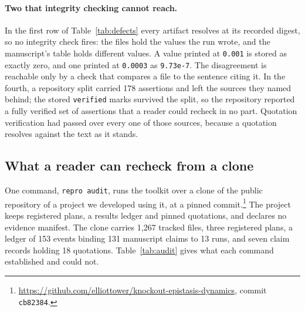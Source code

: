 \documentclass{article}
\newcommand{\code}[1]{\texttt{#1}}
\begin{document}
\paragraph{Two that integrity checking cannot reach.} In the first row of Table~\ref{tab:defects} every artifact resolves at
its recorded digest, so no integrity check fires: the files hold the values the run wrote, and the
manuscript's table holds different values. A value printed at \code{0.001} is stored as exactly
zero, and one printed at \code{0.0003} as \code{9.73e-7}. The disagreement is reachable only by a
check that compares a file to the sentence citing it. In the fourth, a repository split carried 178
assertions and left the sources they named behind; the stored \code{verified} marks survived the
split, so the repository reported a fully verified set of assertions that a reader could recheck in no
part. Quotation verification had passed over every one of those sources, because a quotation
resolves against the text as it stands.

\subsection{What a reader can recheck from a clone}
\label{sec:comparative}

One command, \code{repro audit}, runs the toolkit over a clone of the public repository of a
project we developed using it, at a pinned commit.\footnote{\url{https://github.com/elliottower/knockout-epistasis-dynamics},
commit \code{cb82384}.} The project keeps registered plans, a results ledger and pinned quotations,
and declares no evidence manifest. The clone carries 1{,}267 tracked files, three registered
plans, a ledger of 153 events binding 131 manuscript claims to 13 runs, and seven claim records
holding 18 quotations. Table~\ref{tab:audit} gives what each command established and could not.
\end{document}
